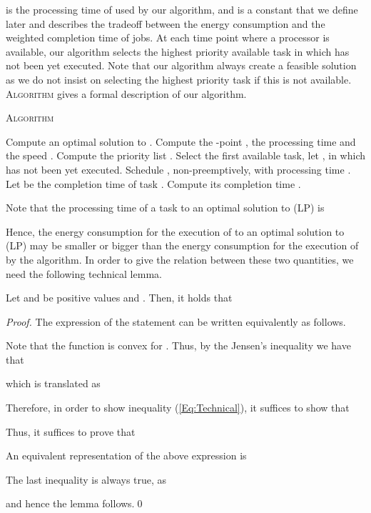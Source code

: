 \documentclass{llncs}
\newcommand{\algomr}{\textsc{Algorithm} \xspace}
\begin{document}
is the processing time of  used by our algorithm,
and  is a constant that we define later and describes the tradeoff between the energy consumption and the weighted completion time of jobs.
At each time point where a processor  is available,
our algorithm selects the highest priority available task in  which has not been yet executed.
Note that our algorithm always create a feasible solution as we do not insist on selecting the highest priority task if this is not available.
\algomr gives a formal description of our algorithm.

\begin{algorithm}
\algomr
\begin{algorithmic}[1]
\STATE Compute an optimal solution  to .
\STATE Compute the -point , the processing time  and the speed .
\ENDFOR
{}
\STATE Compute the priority list .
\ENDFOR
{}
\STATE Select the first available task, let , in  which has not been yet executed.
\STATE Schedule , non-preemptively, with processing time .\\Let  be the completion time of task .
\ENDFOR
{}
\STATE Compute its completion time .
\ENDFOR
\end{algorithmic}
\end{algorithm}

Note that the processing time of a task  to an optimal solution to (LP) is

Hence, the energy consumption 
for the execution of  to an optimal solution to (LP) may be smaller or bigger than
the energy consumption  for the execution of  by the algorithm.
In order to give the relation between these two quantities, we need the following technical lemma.

\begin{lemma} \label{le:technical}
Let  and  be positive values and .
Then, it holds that

\end{lemma}
\begin{proof}
The expression of the statement can be written equivalently as follows.

Note that the function  is convex for .
Thus, by the Jensen's inequality we have that

which is translated as

Therefore, in order to show inequality (\ref{Eq:Technical}), it suffices to show that

Thus, it suffices to prove that

An equivalent representation of the above expression is

The last inequality is always true, as

and hence the lemma follows.\qed
\end{proof}
\end{document}
